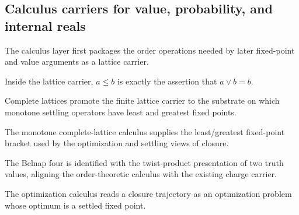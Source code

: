 \subsection{Calculus carriers for value, probability, and internal reals}

\begin{theorem}\label{thm:order-lattice-carrier}\leanok{}
The calculus layer first packages the order operations needed by later fixed-point and value
arguments as a lattice carrier.
\end{theorem}

\begin{theorem}\label{thm:order-le-iff-join}\leanok{}
Inside the lattice carrier, $a \le b$ is exactly the assertion that $a \vee b=b$.
\end{theorem}

\begin{theorem}\label{thm:complete-lattice-carrier}\leanok{}
Complete lattices promote the finite lattice carrier to the substrate on which monotone settling
operators have least and greatest fixed points.
\end{theorem}

\begin{theorem}\label{thm:knaster-tarski-fixed-points}\leanok{}
The monotone complete-lattice calculus supplies the least/greatest fixed-point bracket used by the
optimization and settling views of closure.
\end{theorem}

\begin{theorem}\label{thm:four-as-twist-two}\leanok{}
The Belnap four is identified with the twist-product presentation of two truth values, aligning the
order-theoretic calculus with the existing charge carrier.
\end{theorem}

\begin{theorem}\label{thm:optimization-is-settling}\leanok{}
The optimization calculus reads a closure trajectory as an optimization problem whose optimum is a
settled fixed point.
\end{theorem}

